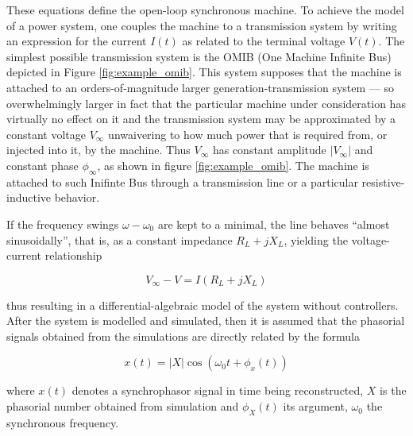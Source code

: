 	These equations define the open-loop synchronous machine. To achieve the model of a power system, one couples the machine to a transmission system by writing an expression for the current $I(t)$ as related to the terminal voltage $V(t)$. The simplest possible transmission system is the OMIB (One Machine Infinite Bus) depicted in Figure \ref{fig:example_omib}. This system supposes that the machine is attached to an orders-of-magnitude larger generation-transmission system — so overwhelmingly larger in fact that the particular machine under consideration has virtually no effect on it and the transmission system may be approximated by a constant voltage $V_\infty$ unwaivering to how much power that is required from, or injected into it, by the machine. Thus $V_\infty$ has constant amplitude $\left\lvert V_\infty\right\rvert$ and constant phase $\phi_\infty$, as shown in figure \ref{fig:example_omib}. The machine is attached to such Inifinte Bus through a transmission line or a particular resistive-inductive behavior. 

	If the frequency swings $\omega - \omega_0$ are kept to a minimal, the line behaves ``almost sinusoidally'', that is, as a constant impedance $R_L + jX_L$, yielding the voltage-current relationship

\begin{equation} V_\infty - V = I\left(R_L + jX_L\right) \label{eq:omib_line}\end{equation}

	\noindent thus resulting in a differential-algebraic model of the system without controllers. After the system is modelled and simulated, then it is assumed that the phasorial signals obtained from the simulations are directly related by the formula

\begin{equation} x(t) = \left\lvert X\right\rvert \cos\left(\omega_0 t + \phi_x(t)\right) \label{eq:equivalent_emt_X}\end{equation}

	\noindent where $x(t)$ denotes a synchrophasor signal in time being reconstructed, $X$ is the phasorial number obtained from simulation and $\phi_X(t)$ its argument, $\omega_0$ the synchronous frequency.

